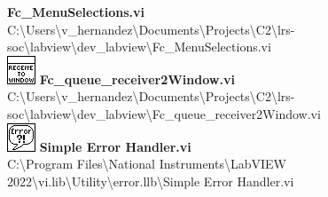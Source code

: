 \documentclass[
]{article}
\begin{document}
\textbf{Fc\_MenuSelections.vi\\
}
C:\textbackslash Users\textbackslash v\_hernandez\textbackslash Documents\textbackslash Projects\textbackslash C2\textbackslash lrs-soc\textbackslash labview\textbackslash dev\_labview\textbackslash Fc\_MenuSelections.vi\\
\includegraphics{Fc_queue_receiver2Window_viLVtemp20240312184738_5_0.png}
\textbf{Fc\_queue\_receiver2Window.vi\\
}
C:\textbackslash Users\textbackslash v\_hernandez\textbackslash Documents\textbackslash Projects\textbackslash C2\textbackslash lrs-soc\textbackslash labview\textbackslash dev\_labview\textbackslash Fc\_queue\_receiver2Window.vi\\
\includegraphics{Simple_Error_Handler_viLVtemp20240312184738_6_0.png}
\textbf{Simple Error Handler.vi\\
} C:\textbackslash Program Files\textbackslash National
Instruments\textbackslash LabVIEW
2022\textbackslash vi.lib\textbackslash Utility\textbackslash error.llb\textbackslash Simple
Error Handler.vi\\
\end{document}
